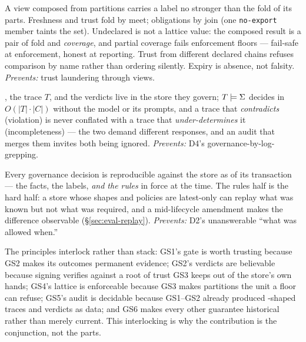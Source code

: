 \begin{description}[leftmargin=1.4em,itemsep=0.35em]
\item[GS4 --- Non-widening composition.] A view composed from
  partitions carries a label no stronger than the fold of its parts.
  Freshness and trust fold by meet; obligations by join (one
  \texttt{no-export} member taints the set). Undeclared is not a
  lattice value: the composed result is a pair of fold and
  \emph{coverage}, and partial coverage fails enforcement floors ---
  fail-safe at enforcement, honest at reporting. Trust from different
  declared chains refuses comparison by name rather than ordering
  silently. Expiry is absence, not falsity. \emph{Prevents:} trust
  laundering through views.
\item[GS5 --- In-store decidable audit.] \Sig, the trace $T$, and the
  verdicts live in the store they govern; $T \models \Sigma$ decides in
  $O(|T|\cdot|C|)$ without the model or its prompts, and a trace that
  \emph{contradicts} \Sig (violation) is never conflated with a trace
  that \emph{under-determines} it (incompleteness) --- the two demand
  different responses, and an audit that merges them invites both
  being ignored. \emph{Prevents:} D4's governance-by-log-grepping.
\item[GS6 --- As-of replay.] Every governance decision is reproducible
  against the store as of its transaction --- the facts, the labels,
  \emph{and the rules} in force at the time. The rules half is the
  hard half: a store whose shapes and policies are latest-only can
  replay what was known but not what was required, and a mid-lifecycle
  amendment makes the difference observable
  (\S\ref{sec:eval-replay}). \emph{Prevents:} D2's unanswerable
  ``what was allowed when.''
\end{description}

The principles interlock rather than stack: GS1's gate is worth
trusting because GS2 makes its outcomes permanent evidence; GS2's
verdicts are believable because signing verifies against a root of
trust GS3 keeps out of the store's own hands; GS4's lattice is
enforceable because GS3 makes partitions the unit a floor can refuse;
GS5's audit is decidable because GS1--GS2 already produced
\Sig-shaped traces and verdicts as data; and GS6 makes every other
guarantee historical rather than merely current. This interlocking is
why the contribution is the conjunction, not the parts.
